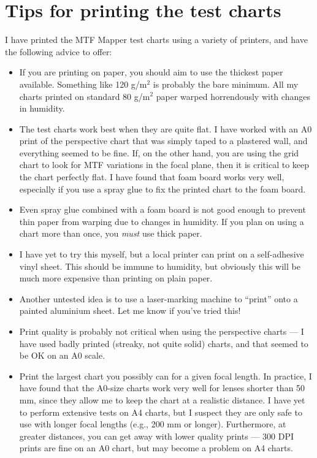 \documentclass[a4paper]{article}
\begin{document}
\section{Tips for printing the test charts}
\label{sec:tips}
I have printed the MTF Mapper test charts using a variety of printers, and
have the following advice to offer:
\begin{itemize}
  \item If you are printing on paper, you should aim to use the thickest
  paper available. Something like 120 g/m$^2$ is probably the bare minimum.
  All my charts printed on standard 80 g/m$^2$ paper warped horrendously
  with changes in humidity.
  \item The test charts work best when they are quite flat. I have worked
  with an A0 print of the perspective chart that was simply taped to a
  plastered wall, and everything seemed to be fine. If, on the other hand,
  you are using the grid chart to look for MTF variations in the focal plane, 
  then it is critical to keep the chart perfectly
  flat. I have found that foam board works very well, especially if you use
  a spray glue to fix the printed chart to the foam board.
  \item Even spray glue combined with a foam board is not good enough to
  prevent thin paper from warping due to changes in humidity. If you plan on
  using a chart more than once, you \emph{must} use thick paper.
  \item I have yet to try this myself, but a local printer can print on a
  self-adhesive vinyl sheet. This should be immune to humidity, but
  obviously this will be much more expensive than printing on plain paper.
  \item Another untested idea is to use a laser-marking machine to ``print''
  onto a painted aluminium sheet. Let me know if you've tried this!
  \item Print quality is probably not critical when using the perspective
  charts --- I have used badly printed (streaky, not quite solid) charts,
  and that seemed to be OK on an A0 scale.
  \item Print the largest chart you possibly can for a given focal length.
  In practice, I have found that the A0-size charts work very well for
  lenses shorter than 50 mm, since they allow me to keep the chart at a 
  realistic distance. I have yet to perform extensive tests on A4 charts, 
  but I suspect they are only safe to  use with longer focal lengths 
  (e.g., 200 mm or longer). Furthermore, at greater distances, you can get
  away with lower quality prints --- 300 DPI prints are fine on an A0 chart,
  but may become a problem on A4 charts.
\end{itemize}
\end{document}
